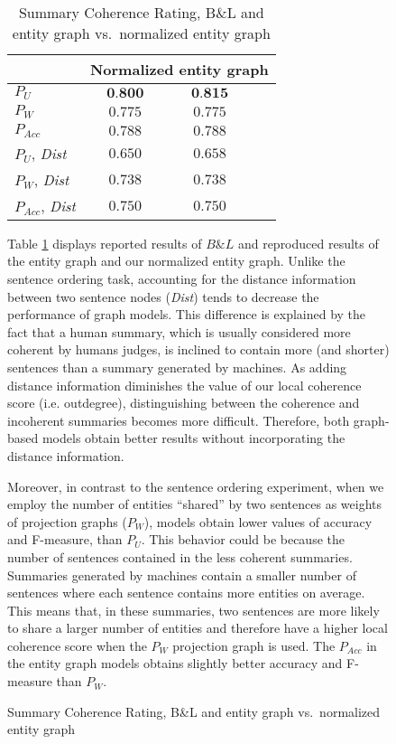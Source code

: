 \begin{figure}[!t]
\begin{table}[!t]
\begin{small}
\begin{tabular}{l|cc@{}l}
 & \multicolumn{3}{|c}{Normalized entity graph} \\\hline 
$P_U$ & $\textbf{0.800}$ & $\textbf{0.815}$&  \\
$P_W$ & $0.775$ & $0.775$& \\
$P_{Acc}$ & $0.788$ & $0.788$& \\  
$P_U$, \textit{Dist} & $0.650$ & $0.658$ \\
$P_W$, \textit{Dist} & $0.738$ & $0.738$  \\
$P_{Acc}$, \textit{Dist} & $0.750$ & $0.750$  \\
\end{tabular}
\end{small}
\caption{Summary Coherence Rating, B\&L and entity
  graph vs.\ normalized entity graph}
 \label{table:summary_coherence_ranking}
\end{table}

Table \ref{table:summary_coherence_ranking} displays reported results of $B\&L$ and reproduced results of the entity graph and our normalized entity graph. 
Unlike the sentence ordering task, accounting for the distance information between two sentence nodes (\textit{Dist}) tends to decrease the performance of graph models. 
This difference is explained by the fact that a human summary, which is usually considered more coherent by humans judges, is inclined to contain more (and shorter) sentences than a summary generated by machines. 
As adding distance information diminishes the value of our local coherence score (i.e. outdegree), distinguishing between the coherence and incoherent summaries becomes more difficult. 
Therefore, both graph-based models obtain better results without incorporating the distance information. 


Moreover, in contrast to the sentence ordering experiment, when we employ the number of entities ``shared” by two sentences as weights of projection graphs ($P_W$), models obtain lower values of accuracy and F-measure, than $P_U$. 
This behavior could be because the number of sentences contained in the less coherent summaries. 
Summaries generated by machines contain a smaller number of sentences where each sentence contains more entities on average. 
This means that, in these summaries, two sentences are more likely to share a larger number of entities and therefore have a
higher local coherence score when the $P_W$ projection graph is used.  
The $P_{Acc}$ in the entity graph models obtains slightly better accuracy and F-measure than $P_W$. 



\end{figure}
